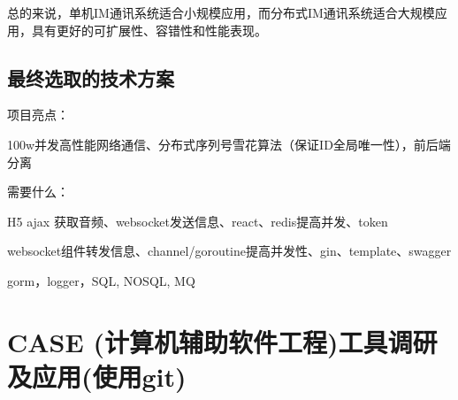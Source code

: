 \documentclass[12pt]{article}
\begin{document}
	总的来说，单机IM通讯系统适合小规模应用，而分布式IM通讯系统适合大规模应用，具有更好的可扩展性、容错性和性能表现。
	
	\subsection{最终选取的技术方案}
	项目亮点：
	
	100w并发高性能网络通信、分布式序列号雪花算法（保证ID全局唯一性），前后端分离
	
	需要什么：
	
	H5 ajax 获取音频、websocket发送信息、react、redis提高并发、token
	
	websocket组件转发信息、channel/goroutine提高并发性、gin、template、swagger
	
	gorm，logger，SQL, NOSQL, MQ
	\section{CASE (计算机辅助软件工程)工具调研及应用(使用git)}
	
\end{document}
